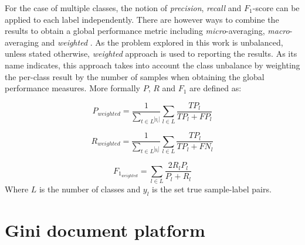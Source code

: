 For the case of multiple classes, the notion of \textit{precision}, \textit{recall} and $F_1$-score can be applied to each label independently. There are however ways to combine the results to obtain a global performance metric including \textit{micro}-averaging, \textit{macro}-averaging  and \textit{weighted} \cite{Sebastiani02}. As the problem explored in this work is unbalanced,  unless stated otherwise, \textit{weighted}  approach is used to reporting the results. As its name indicates, this approach takes into account the class unbalance by weighting the per-class result by the number of samples  when obtaining the global performance measures. More formally $P$, $R$ and $F_1$ are defined as:


\begin{equation*}
P_{weighted}=\frac{1}{\sum_{t \in L^|y_t|} } \sum_{l \in L} \frac{TP_l}{TP_l+FP_l} 
\end{equation*}

\begin{equation*}
  R_{weighted} = \frac{1}{\sum_{t \in L^|y_t|} } \sum_{l \in L} \frac{TP_l}{TP_l+FN_l}
\end{equation*}


\begin{equation*}
  F_{1_{weighted}}=\sum_{l \in L}\frac{2R_lP_l}{P_l+R_l}
\end{equation*}
Where $L$ is the number of classes and $y_l$ is the set true sample-label pairs.






\section{Gini document platform}
\label{sec:gini_doc_platform}

